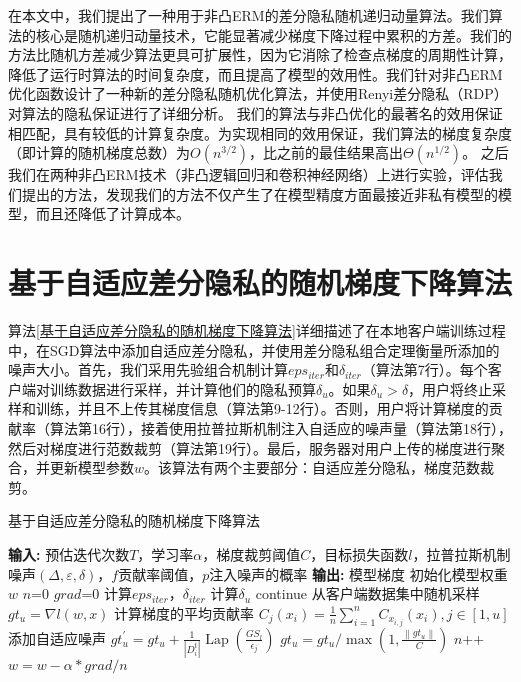 在本文中，我们提出了一种用于非凸ERM的差分隐私随机递归动量算法。我们算法的核心是随机递归动量技术，它能显著减少梯度下降过程中累积的方差。我们的方法比随机方差减少算法更具可扩展性，因为它消除了检查点梯度的周期性计算，降低了运行时算法的时间复杂度，而且提高了模型的效用性。我们针对非凸ERM优化函数设计了一种新的差分隐私随机优化算法，并使用Renyi差分隐私（RDP）对算法的隐私保证进行了详细分析。 我们的算法与非凸优化的最著名的效用保证相匹配，具有较低的计算复杂度。为实现相同的效用保证，我们算法的梯度复杂度（即计算的随机梯度总数）为$O\left(n^{3 / 2}\right)$，比之前的最佳结果高出$\Theta\left(n^{1 / 2}\right)$。 之后我们在两种非凸ERM技术（非凸逻辑回归和卷积神经网络）上进行实验，评估我们提出的方法，发现我们的方法不仅产生了在模型精度方面最接近非私有模型的模型，而且还降低了计算成本。

\section{基于自适应差分隐私的随机梯度下降算法}

算法\ref{基于自适应差分隐私的随机梯度下降算法}详细描述了在本地客户端训练过程中，在SGD算法中添加自适应差分隐私，并使用差分隐私组合定理衡量所添加的噪声大小。首先，我们采用先验组合机制计算$eps_{iter}$和$\delta_{iter}$（算法第7行）。每个客户端对训练数据进行采样，并计算他们的隐私预算$\delta_{u}$。如果$\delta_{u}>\delta$，用户将终止采样和训练，并且不上传其梯度信息（算法第9-12行）。否则，用户将计算梯度的贡献率（算法第16行），接着使用拉普拉斯机制注入自适应的噪声量（算法第18行），然后对梯度进行范数裁剪（算法第19行）。最后，服务器对用户上传的梯度进行聚合，并更新模型参数$w$。该算法有两个主要部分：自适应差分隐私，梯度范数裁剪。

\begin{algorithm}[!htb]
	\caption{基于自适应差分隐私的随机梯度下降算法}
	\label{基于自适应差分隐私的随机梯度下降算法}
	\begin{algorithmic}[1]
		\footnotesize
		\STATE \textbf{输入:} 预估迭代次数$T$，学习率$\alpha$，梯度裁剪阈值$C$，目标损失函数$l$，拉普拉斯机制噪声$(\Delta, \varepsilon, \delta)$，$f$贡献率阈值，$p$注入噪声的概率
		\STATE \textbf{输出:} 模型梯度
		\STATE 初始化模型权重$w$
			\STATE $n$=0
			\STATE $grad$=0
			\STATE 计算$eps_{iter}$，$\delta_{iter}$
				\STATE 计算$\delta_{u}$
					\STATE continue
				\ENDIF
				\STATE 从客户端数据集中随机采样
				\STATE $g t_{u}=\nabla l(w, x)$
				\STATE 计算梯度的平均贡献率
				\STATE $C_{j}\left(x_{i}\right)=\frac{1}{n} \sum_{i=1}^{n} C_{x_{i, j}}\left(x_{i}\right), j \in[1, u]$
				\STATE 添加自适应噪声
				\STATE $g t_{u}^{\prime}=g t_{u}+\frac{1}{\left|D_{i}^{t}\right|} \operatorname{Lap}\left(\frac{G S_{l}}{\epsilon_{j}}\right)$
				\STATE $g t_{u}=g t_{u} / \max \left(1, \frac{\left\|g t_{u}\right\|}{C}\right)$
				\STATE $n$++
			\ENDFOR
			\STATE $w=w-\alpha * g r a d / n$
		\ENDWHILE
	\end{algorithmic}
\end{algorithm}

